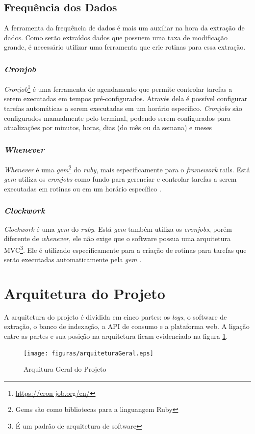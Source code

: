 \subsection{Frequência dos Dados}
A ferramenta da frequência de dados é mais um auxiliar na hora da extração de dados. Como serão extraídos dados que possuem uma taxa de modificação grande, é necessário utilizar uma ferramenta que crie rotinas para essa extração.
\subsubsection*{\textit{Cronjob}}
\textit{Cronjob}\footnote[4]{\url{https://cron-job.org/en/}} é uma ferramenta de agendamento que permite controlar tarefas a serem executadas em tempos pré-configurados. Através dela é possível configurar tarefas automáticas a serem executadas em um horário específico. \textit{Cronjobs} são configurados manualmente pelo terminal, podendo serem configurados para atualizações por minutos, horas, dias (do mês ou da semana) e meses
\subsubsection*{\textit{Whenever}}
\textit{Whenever} é uma \textit{gem}\footnote[5]{Gems são como bibliotecas para a linguangem Ruby} do \textit{ruby}, mais especificamente para o \textit{framework} rails. Está \textit{gem} utiliza os \textit{cronjobs} como fundo para gerenciar e controlar tarefas a serem executadas em rotinas ou em um horário específico \cite{whenever}.
\subsubsection*{\textit{Clockwork}}
\textit{Clockwork} é uma \textit{gem} do \textit{ruby}. Está \textit{gem} também utiliza os \textit{cronjobs}, porém diferente de \textit{whenever}, ele não exige que o software possua uma arquitetura MVC\footnote[6]{É um padrão de arquitetura de software}. Ele é utilizado especificamente para a criação de rotinas para tarefas que serão executadas automaticamente pela \textit{gem} \cite{clockwork}.
\section{Arquitetura do Projeto}
A arquitetura do projeto é dividida em cinco partes: os \textit{logs}, o software de extração, o banco de indexação, a API de consumo e a plataforma web. A ligação entre as partes e sua posição na arquitetura ficam evidenciado na figura \ref{image:arquitetura}.
\begin{figure}
\centering
\texttt{[image: figuras/arquiteturaGeral.eps]}
\caption{Arquitura Geral do Projeto}
\label{image:arquitetura}
\end{figure}
